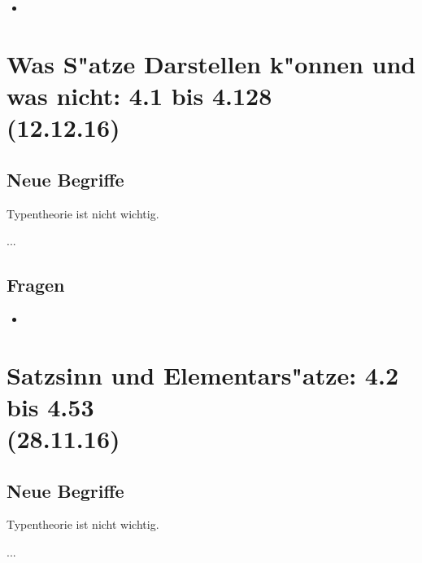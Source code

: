 \documentclass[emulatestandardclasses]{scrartcl}
\begin{document}
\begin{itemize}
  \item 
\end{itemize}


\section{Was S"atze Darstellen k"onnen und was nicht: 4.1 bis 4.128\\(12.12.16)}

\vspace{10pt}
\subsection{Neue Begriffe}

Typentheorie ist nicht wichtig.

\begin{description}[leftmargin=!,labelwidth=\widthof{\bfseries Sachverhalt}]
  \item[Bild] ...
  \item[Tatsache] 
\end{description}

\subsection{Fragen}

\begin{itemize}
  \item 
\end{itemize}


\section{Satzsinn und Elementars"atze: 4.2 bis 4.53\\(28.11.16)}

\vspace{10pt}
\subsection{Neue Begriffe}

Typentheorie ist nicht wichtig.

\begin{description}[leftmargin=!,labelwidth=\widthof{\bfseries Sachverhalt}]
  \item[Bild] ...
  \item[Tatsache] 
\end{description}
\end{document}
